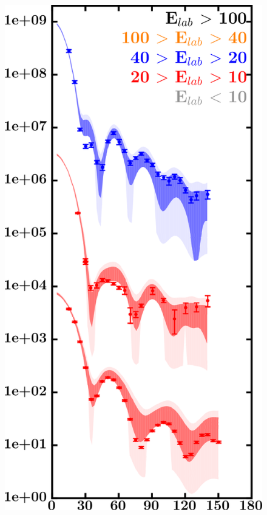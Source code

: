 \documentclass[twocolumn,secnumarabic,amssymb, nobibnotes, aps, prl,
superscriptaddress, nobalancelastpage, draft]{revtex4}
\begin{document}
\begin{figure}[!htb]
\begin{minipage}{0.4\linewidth}
        \includegraphics[width=\linewidth]{figures/sn124_neutronElastic.png}
        \label{DOM_sn124_neutron_elastic}
    \end{minipage}
    \centering
    \begin{minipage}{0.4\linewidth}
        \centering

\end{minipage}
\end{figure}
\end{document}
